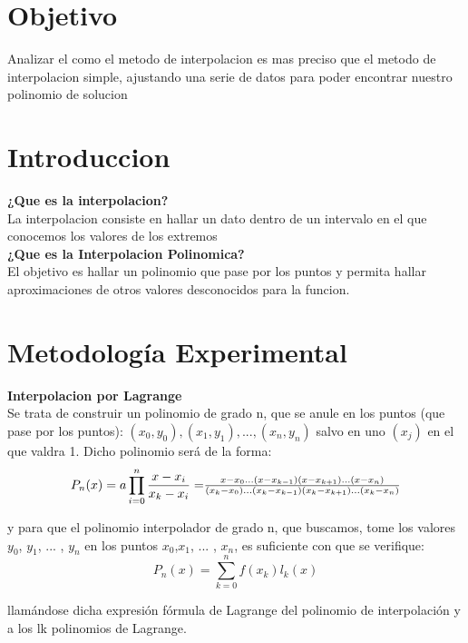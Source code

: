 \documentclass{article}
\begin{document}
\begin{multicols}{2}

\section{Objetivo}
\label{sec:obj}
  Analizar el como el metodo de interpolacion es mas preciso que el metodo de interpolacion simple, ajustando una serie de datos para poder encontrar nuestro polinomio de solucion

\section{Introduccion}
\label{sec:Intro}
\textbf{¿Que es la interpolacion?}
\\
La interpolacion consiste en hallar un dato dentro de un intervalo en el que conocemos los valores de los extremos
\\

\textbf{¿Que es la Interpolacion Polinomica?}
\\
El objetivo es hallar un polinomio que pase por los puntos y permita hallar aproximaciones de otros valores desconocidos para la funcion.

\section{Metodología Experimental}
\label{sec:Met}
\textbf{Interpolacion por Lagrange}
\\
Se trata de construir un polinomio de grado n, que se anule en los puntos (que pase por los puntos): 
$(x_{0},y_{0}), (x_{1},y_{1}),... ,(x_{n},y_{n})$ salvo en uno $(x_{j})$  en el que valdra 1.
Dicho polinomio será de la forma:
\begin{equation}
P_{n}(x)=a \prod_{i=0}^{n} \frac{x-x_{i}}{x_{k}-x_{i}} =$$
\\
$$ \frac{x-x_{0}...(x-x_{k-1})(x-x_{k+1})...(x-x_{n})}{(x_{k}-x_{0})...(x_{k}-x_{k-1})(x_{k}-x_{k+1})...(x_{k}-x_{n})}
\end{equation}

y para que el polinomio interpolador de grado n, que buscamos, tome los valores $y_{0}$, $y_{1}$, ... , $y_{n}$ en los puntos $x_{0}$,$x_{1}$, ... , $x_{n}$, es suficiente con que se verifique:
\begin{equation}
P_{n}(x)= \sum_{k=0}^{n} f(x_{k})l_{k}(x)
\end{equation}

llamándose dicha expresión fórmula de Lagrange del polinomio de interpolación y a los lk polinomios de Lagrange.


\end{multicols}
\end{document}
